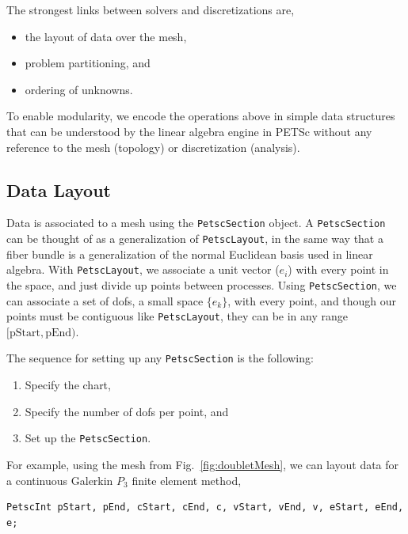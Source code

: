 {The strongest links between solvers and discretizations are,
\begin{itemize}
  \item the layout of data over the mesh,
  \item problem partitioning, and
  \item ordering of unknowns.
\end{itemize}
To enable modularity, we encode the operations above in simple data structures that can be understood by the linear
algebra engine in PETSc without any reference to the mesh (topology) or discretization (analysis).

\subsection{Data Layout}

Data is associated to a mesh using the \lstinline{PetscSection} object. A \lstinline{PetscSection} can be thought of as a generalization of
\lstinline{PetscLayout}, in the same way that a fiber bundle is a generalization of the normal Euclidean basis used in linear
algebra. With \lstinline{PetscLayout}, we associate a unit vector ($e_i$) with every point in the space, and just divide up points
between processes. Using \lstinline{PetscSection}, we can associate a set of dofs, a small space $\{e_k\}$, with every point, and
though our points must be contiguous like \lstinline{PetscLayout}, they can be in any range $[\mathrm{pStart}, \mathrm{pEnd})$.

The sequence for setting up any \lstinline{PetscSection} is the following:
\begin{enumerate}
  \item Specify the chart,
  \item Specify the number of dofs per point, and
  \item Set up the \lstinline{PetscSection}.
\end{enumerate}
For example, using the mesh from Fig.~\ref{fig:doubletMesh}, we can layout data for a continuous Galerkin $P_3$ finite
element method,
\begin{lstlisting}
PetscInt pStart, pEnd, cStart, cEnd, c, vStart, vEnd, v, eStart, eEnd, e;


\end{lstlisting}}

